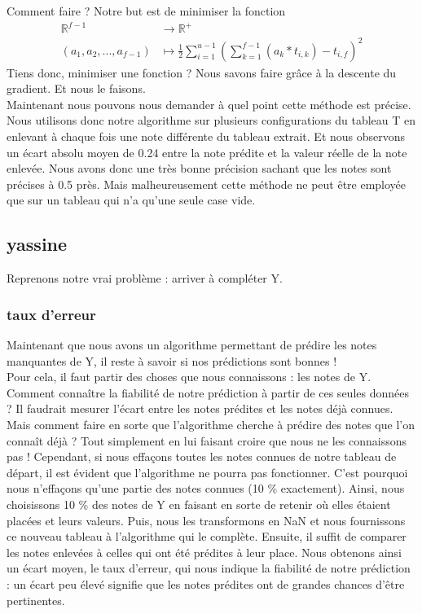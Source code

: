 \documentclass[a4paper,10pt]{article}
\begin{document}
Comment faire ? Notre but est de minimiser la fonction
\begin{align*}
\mathbb{R}^{f-1}&\longrightarrow \mathbb{R}^+\\ 
(a_1, a_2, ..., a_{f-1})&\longmapsto \frac{1}{2}\sum_{i = 1}^{u - 1} (\sum_{k = 1}^{f-1} (a_k * t_{i, k}) - t_{i, f})^2
\end{align*}
Tiens donc, minimiser une fonction ? Nous savons faire grâce à la descente du gradient. Et nous le faisons.\\

Maintenant nous pouvons nous demander à quel point cette méthode est précise. Nous utilisons donc notre algorithme sur plusieurs configurations du tableau T en enlevant à chaque fois une note différente du tableau extrait. Et nous observons un écart absolu moyen de 0.24 entre la note prédite et la valeur réelle de la note enlevée. Nous avons donc une très bonne précision sachant que les notes sont précises à 0.5 près. Mais malheureusement cette méthode ne peut être employée que sur un tableau qui n'a qu'une seule case vide.

\subsection{yassine}

Reprenons notre vrai problème : arriver à compléter Y.

\subsubsection{taux d'erreur}

Maintenant que nous avons un algorithme permettant de prédire les notes manquantes de Y, il reste à savoir si nos prédictions sont bonnes !\\

Pour cela, il faut partir des choses que nous connaissons : les notes de Y. 
Comment connaître la fiabilité de notre prédiction à partir de ces seules données ?  
Il faudrait mesurer l'écart entre les notes prédites et les notes déjà connues.
Mais comment faire en sorte que l'algorithme cherche à prédire des notes que l'on connaît déjà ?
Tout simplement en lui faisant croire que nous ne les connaissons pas !
Cependant, si nous effaçons toutes les notes connues de notre tableau de départ, il est évident que l'algorithme ne pourra pas fonctionner.
C'est pourquoi nous n'effaçons qu'une partie des notes connues (10 \% exactement). 
Ainsi, nous choisissons 10 \% des notes de Y en faisant en sorte de retenir où elles étaient placées et leurs valeurs. 
Puis, nous les transformons en NaN et nous fournissons ce nouveau tableau à l'algorithme qui le complète.
Ensuite, il suffit de comparer les notes enlevées à celles qui ont été prédites à leur place. 
Nous obtenons ainsi un écart moyen, le taux d'erreur, qui nous indique la fiabilité de notre prédiction : 
un écart peu élevé signifie que les notes prédites ont de grandes chances d'être pertinentes.
\end{document}
